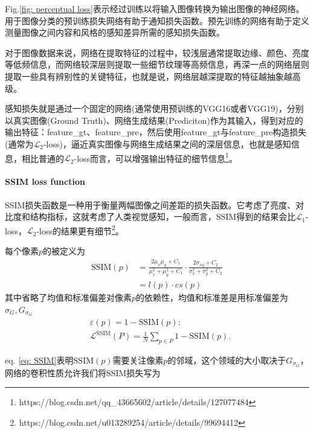 \documentclass[letterpaper,12pt]{article}
\begin{document}
	Fig.\ref{fig: perceptual loss}表示经过训练以将输入图像转换为输出图像的神经网络。用于图像分类的预训练损失网络有助于通知损失函数。预先训练的网络有助于定义测量图像之间内容和风格的感知差异所需的感知损失函数。
	
	对于图像数据来说，网络在提取特征的过程中，较浅层通常提取边缘、颜色、亮度等低频信息，而网络较深层则提取一些细节纹理等高频信息，再深一点的网络层则提取一些具有辨别性的关键特征，也就是说，网络层越深提取的特征越抽象越高级。
	
	感知损失就是通过一个固定的网络(通常使用预训练的VGG16或者VGG19)，分别以真实图像(Ground Truth)、网络生成结果(Prediciton)作为其输入，得到对应的输出特征：feature\_gt、feature\_pre，然后使用feature\_gt与feature\_pre构造损失(通常为$\mathcal{L}_2$-loss)，逼近真实图像与网络生成结果之间的深层信息，也就是感知信息，相比普通的$\mathcal{L}_2$-loss而言，可以增强输出特征的细节信息\footnote{https://blog.csdn.net/qq\_43665602/article/details/127077484}。
	
	\paragraph{SSIM loss function}
	
	SSIM损失函数是一种用于衡量两幅图像之间差距的损失函数。它考虑了亮度、对比度和结构指标，这就考虑了人类视觉感知，一般而言，SSIM得到的结果会比$\mathcal{L}_1$-loss，$\mathcal{L}_2$-loss的结果更有细节\footnote{https://blog.csdn.net/u013289254/article/details/99694412}。
	
	每个像素$p$的被定义为
	\begin{equation}
		\begin{aligned}
			\text{SSIM}(p) &= \frac{2\mu_{x}\mu_{y}+C_{1}}{\mu_{x}^2+\mu_{y}^2+C_{1}} \cdot \frac{2\sigma_{xy}+C_{2}}{\sigma_{x}^2+\sigma_{y}^{2}+C_{2}} \\
			&= l(p)\cdot cs(p)
		\end{aligned}
		\label{eq: SSIM}
	\end{equation}
	其中省略了均值和标准偏差对像素$p$的依赖性，均值和标准差是用标准偏差为$\sigma_G,G_{\sigma_G}$
	\begin{equation}
		\begin{aligned}
			&\varepsilon(p)=1-\text{SSIM}(p): \\  &\mathcal{L}^{\text{SSIM}}(P)=\frac{1}{N}\sum_{p \in P}1-\text{SSIM}(p).
		\end{aligned}
		\label{eq: SSIM loss}
	\end{equation}
	
	eq. \ref{eq: SSIM}表明$\text{SSIM}(p)$需要关注像素$p$的邻域，这个领域的大小取决于$G_{\sigma_G}$，网络的卷积性质允许我们将SSIM损失写为
	
\end{document}
